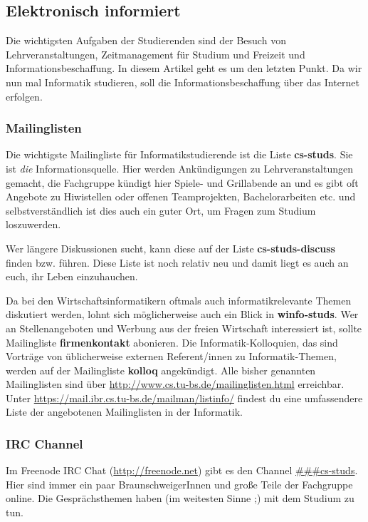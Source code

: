 \subsection{Elektronisch informiert}
	\label{elekinf}
	Die wichtigsten Aufgaben der Studierenden sind der Besuch von Lehrveranstaltungen, Zeitmanagement für Studium und Freizeit und Informationsbeschaffung. In diesem Artikel geht es um den letzten Punkt. Da wir nun mal Informatik studieren, soll die Informationsbeschaffung über das Internet erfolgen.

	\subsubsection*{Mailinglisten}
	\label{mailinglisten}
		Die wichtigste Mailingliste für Informatikstudierende ist die Liste \textbf{cs-studs}. Sie ist \emph{die} Informationsquelle. Hier werden Ankündigungen zu Lehrveranstaltungen gemacht, die Fachgruppe kündigt hier Spiele- und Grillabende an und es gibt oft Angebote zu Hiwistellen oder offenen Teamprojekten, Bachelorarbeiten etc. und selbstverständlich ist dies auch ein guter Ort, um Fragen zum Studium loszuwerden.

		Wer längere Diskussionen sucht, kann diese auf der Liste \textbf{cs-studs-discuss} finden bzw. führen. Diese Liste ist noch relativ neu und damit liegt es auch an euch, ihr Leben einzuhauchen.

		Da bei den Wirtschaftsinformatikern oftmals auch informatikrelevante Themen diskutiert werden, lohnt sich möglicherweise auch ein Blick in \textbf{winfo-studs}. 
		Wer an Stellenangeboten und Werbung aus der freien
		Wirtschaft interessiert ist, sollte Mailingliste
		\textbf{firmenkontakt} abonieren. Die
		Informatik-Kolloquien, das sind Vorträge von
		üblicherweise externen Referent/innen zu Informatik-Themen,
		werden auf der Mailingliste \textbf{kolloq} angekündigt.
		Alle bisher genannten Mailinglisten sind über
		\url{http://www.cs.tu-bs.de/mailinglisten.html}
		erreichbar. Unter
		\url{https://mail.ibr.cs.tu-bs.de/mailman/listinfo/}
		findest du eine umfassendere Liste der angebotenen Mailinglisten in der Informatik.

	\subsubsection*{IRC Channel}
		Im Freenode IRC Chat (\url{http://freenode.net}) gibt es den Channel \url{###cs-studs}. Hier sind immer ein paar BraunschweigerInnen und große Teile der Fachgruppe online. Die Gesprächsthemen haben (im weitesten Sinne ;) mit dem Studium zu tun.

